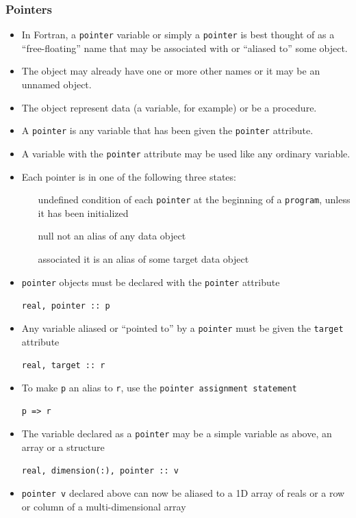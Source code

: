 \documentclass[c,mathserif,compress,xcolor=svgnames]{beamer}
\newcommand{\lstfortran}[1]{\lstinline[language={[90]Fortran},basicstyle=\footnotesize\ttfamily]|#1|}
\begin{document}
\begin{frame}
  \frametitle{\small Pointers}
  \begin{itemize}
    \item In Fortran, a \lstfortran{pointer} variable or simply a \lstfortran{pointer} is best thought of as a ``free-floating'' name that may be associated with or ``aliased to'' some object.
    \item The object may already have one or more other names or it may be an unnamed object.
    \item The object represent data (a variable, for example) or be a procedure.
    \item A \lstfortran{pointer} is any variable that has been given the \lstfortran{pointer} attribute.
    \item A variable with the \lstfortran{pointer} attribute may be used like any ordinary variable.
      \framebreak
    \item Each pointer is in one of the following three states:
      \begin{itemize}
        \item[undefined] condition of each \lstfortran{pointer} at the beginning of a \lstfortran{program}, unless it has been initialized
        \item[null] not an alias of any data object
        \item[associated] it is an alias of some target data object
      \end{itemize}
    \item \lstfortran{pointer} objects must be declared with the \lstfortran{pointer} attribute
    \item[] \lstfortran{real, pointer :: p}
    \item Any variable aliased or ``pointed to'' by a \lstfortran{pointer} must be given the \lstfortran{target} attribute
    \item[] \lstfortran{real, target :: r}
    \item To make \lstfortran{p} an alias to \lstfortran{r}, use the \lstfortran{pointer assignment statement}
    \item[] \lstfortran{p => r}
      \framebreak
    \item The variable declared as a \lstfortran{pointer} may be a simple variable as above, an array or a structure
    \item[] \lstfortran{real, dimension(:), pointer :: v}
    \item \lstfortran{pointer v} declared above can now be aliased to a 1D array of reals or a row or column of a multi-dimensional array

\end{itemize}
\end{frame}
\end{document}
